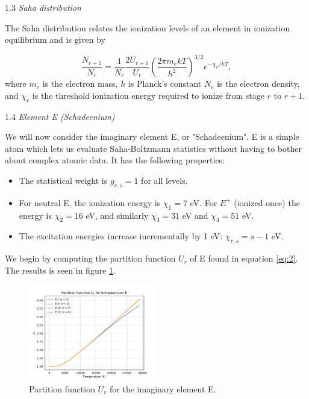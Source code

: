 \documentclass[a4paper,11.5pt,]{article}
\begin{document}
\begin{multicols}{2}
\begin{center}
1.3\textit{ Saha distribution}
\end{center}
The Saha distribution relates the ionization levels of an element in ionization equilibrium and is given by

\begin{equation}\label{eq:4}
    \frac{N_{r+1}}{N_r} = \frac{1}{N_e} \frac{2U_{r+1}}{U_r} \left( \frac{2\pi m_e k T}{h^2} \right)^{3/2} e^{-\chi_r /kT},
\end{equation}
where $m_e$ is the electron mass, $h$ is Planck's constant $N_e$ is the electron density, and $\chi_r$ is the threshold ionization energy required to ionize from stage $r$ to $r+1$.

\begin{center}
1.4\textit{ Element E (Schadeenium)}
\end{center}
We will now consider the imaginary element E, or "Schadeenium". E is a simple atom which lets us evaluate Saha-Boltzmann statistics without having to bother about complex atomic data. It has the following properties:
\begin{itemize}
    \item The statistical weight is $g_{r,s} = 1$ for all levels.
    \item For neutral E, the ionization energy is $\chi_1 = 7$ eV. For $E^+$ (ionized once) the energy is $\chi_2 = 16$ eV, and similarly $\chi_3 = 31$ eV and $\chi_4 = 51$ eV.
    \item The excitation energies increase incrementally by 1 eV: $\chi_{r,s} = s-1$ eV.
\end{itemize}

\noindent We begin by computing the partition function $U_r$ of E found in equation \eqref{eq:2}. The results is seen in figure \ref{fig:1}.

\begin{figure}[H]
	\centering
	\includegraphics[width=0.5\textwidth]{figures/part_E.pdf}
	\caption{Partition function $U_r$ for the imaginary element E.}
	\label{fig:1}
\end{figure}


\end{multicols}
\end{document}
